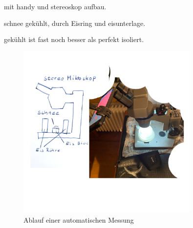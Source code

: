 mit handy und stereoskop aufbau.

schnee gekühlt, durch Eisring und eisunterlage.

gekühlt ist fast noch besser als perfekt isoliert.



\begin{figure}
    \centering
    \includegraphics[width=0.8\textwidth]{Bilder/freistellen.jpeg}
    \caption{Ablauf einer automatischen Messung}
    \label{fig:AutMess}
\end{figure}
